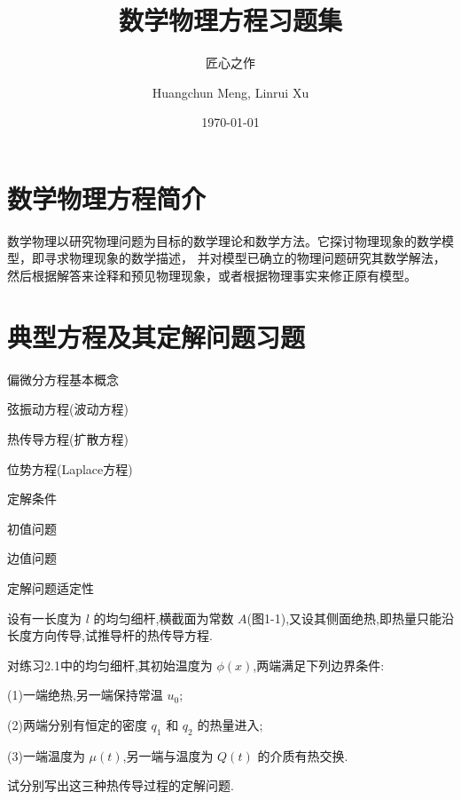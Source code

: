 \documentclass[color=blue,lang=cn,newtx,10pt,scheme=chinese]{elegantbook}
\title{数学物理方程习题集}
\subtitle{匠心之作}
\author{Huangchun Meng, Linrui Xu}
\institute{School of Mathematics NUAA}
\date{\today}
\begin{document}
\maketitle
\frontmatter

\tableofcontents

\mainmatter

\chapter{数学物理方程简介}%

数学物理以研究物理问题为目标的数学理论和数学方法。它探讨物理现象的数学模型，即寻求物理现象的数学描述，
并对模型已确立的物理问题研究其数学解法，然后根据解答来诠释和预见物理现象，或者根据物理事实来修正原有模型。




\chapter{典型方程及其定解问题习题}%

\begin{introduction}
  \item 偏微分方程基本概念
  \item 弦振动方程(波动方程)
  \item 热传导方程(扩散方程)
  \item 位势方程(Laplace方程)
  \item 定解条件
  \item 初值问题
  \item 边值问题
  \item 定解问题适定性
\end{introduction}
\quad

\begin{exercise}
设有一长度为 $l$ 的均匀细杆,横截面为常数 $A$(图1-1),又设其侧面绝热,即热量只能沿长度方向传导,试推导杆的热传导方程.
\end{exercise}
\quad

\begin{solution}
  
\end{solution}
  
\quad

\begin{exercise}
对练习2.1中的均匀细杆,其初始温度为 $\phi (x)$,两端满足下列边界条件:

(1)一端绝热,另一端保持常温 $u_0$;

(2)两端分别有恒定的密度 $q_1$ 和 $q_2$ 的热量进入;

(3)一端温度为 $\mu (t)$,另一端与温度为 $Q(t)$ 的介质有热交换.

试分别写出这三种热传导过程的定解问题.
\end{exercise}
\quad
\end{document}
